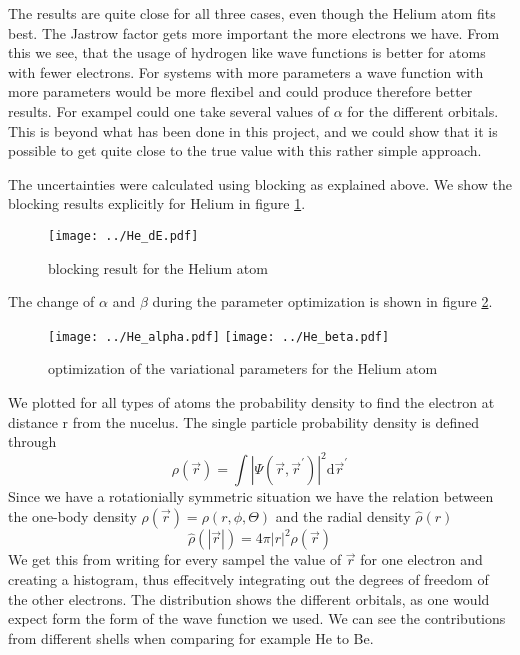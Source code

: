\documentclass[a4paper,10pt]{article}
\newcommand{\ud}{\mathrm{d}}
\begin{document}
The results are quite close for all three cases, even though the Helium atom fits best. 
The Jastrow factor gets more important the more electrons we have. From this we see, that the usage of hydrogen like wave functions is better
for atoms with fewer electrons. 
For systems with more parameters a wave function with more parameters would
be more flexibel and could produce therefore better results. For exampel could one take several values of $\alpha$ for the different orbitals.
This is beyond what has been done in this project, and we could show that it is possible to get quite close to the 
true value with this rather simple approach.


The uncertainties were calculated using blocking as explained above. We show the blocking results explicitly for Helium in figure \ref{HeBlock}. 
\begin{figure}[hbtp]
 \texttt{[image: ../He\_dE.pdf]}
 \caption{blocking result for the Helium atom}
 \label{HeBlock}
\end{figure}

The change of $\alpha$ and $\beta$ during the parameter optimization is shown in figure \ref{opt}. 
\begin{figure}[htbp]
 \label{opt}
  \texttt{[image: ../He\_alpha.pdf]}
  \texttt{[image: ../He\_beta.pdf]}
  \caption{optimization of the variational parameters for the Helium atom}
\end{figure}




We plotted for all types of atoms the probability density to find the electron at distance r from the nucelus. 
The single particle probability density is defined through
\begin{equation}
 \rho(\vec{r}) = \int |\Psi(\vec{r},\vec{r}^{\prime})|^2 \ud \vec{r}^{\prime}
\end{equation}
Since we have a rotationially symmetric situation we have the relation between the one-body density $\rho(\vec{r})=\rho(r,\phi,\Theta)$ 
and the radial density $\hat{\rho}(r)$
\begin{equation}
 \hat{\rho}(|\vec{r}|) =4\pi |r|^2\rho(\vec{r})
\end{equation}
We get this from writing for every sampel the value of $\vec{r}$ for one electron and creating a histogram,
thus effecitvely integrating out the degrees of freedom of the other electrons. 
The distribution shows the different orbitals, as one would expect form the form of the wave function we used.
We can see the contributions from different shells when comparing for example He to Be.
\end{document}
